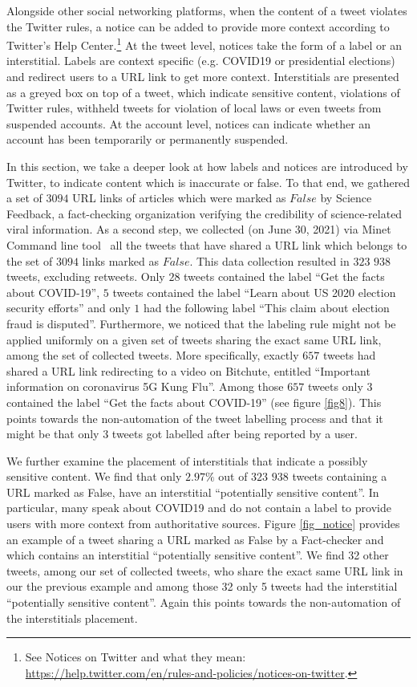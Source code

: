 \documentclass{article}
\begin{document}
Alongside other social networking platforms, when the content of a tweet violates the Twitter rules, a notice can be added to provide more context according to Twitter's Help Center.\footnote{See Notices on Twitter and what they mean: \href{https://help.twitter.com/en/rules-and-policies/notices-on-twitter}{https://help.twitter.com/en/rules-and-policies/notices-on-twitter}.} At the tweet level, notices take the form of a label or an interstitial. Labels are context specific (e.g. COVID19 or presidential elections) and  redirect users to a URL link to get more context. Interstitials are presented as a greyed box on top of a tweet, which indicate sensitive content, violations of Twitter rules, withheld tweets for violation of local laws or even tweets from suspended accounts. At the account level, notices can indicate whether an account has been temporarily or permanently suspended. 

\smallskip

In this section, we take a deeper look at how labels and notices are introduced by Twitter, to indicate content which is inaccurate or false. To that end, we gathered a set of $3094$ URL links of articles which were marked as $False$ by Science Feedback, a fact-checking organization verifying the credibility of science-related viral information. As a second step, we collected (on June 30, 2021) via Minet Command line tool~\cite{minet} all the tweets that have shared a URL link which belongs to the set of $3094$ links marked as $False$. This data collection resulted in $323$ $938$ tweets, excluding retweets. Only $28$ tweets contained the label { ``Get the facts about COVID-19''}, $5$ tweets contained the label { ``Learn about US 2020 election security efforts''} and only $1$ had the following label {``This claim about election fraud is disputed''}. Furthermore, we noticed that the labeling rule might not be applied uniformly on a given set of tweets sharing the exact same URL link, among the set of collected tweets. More specifically, exactly $657$ tweets had shared a URL link redirecting to a video on Bitchute, entitled ``Important information on coronavirus 5G Kung Flu''. Among those $657$ tweets only $3$ contained the label ``Get the facts about COVID-19'' (see figure \ref{fig8}). This points towards the non-automation of the tweet labelling process and that it might be that only $3$ tweets got labelled after being reported by a user. 

We further examine the placement of interstitials that indicate a possibly sensitive content. We find that only $2.97\%$ out of $323$ $938$ tweets containing a URL marked as False, have an interstitial ``potentially sensitive content''. In particular, many speak about COVID19 and do not contain a label to provide users with more context from authoritative sources. Figure \ref{fig_notice} provides an example of a tweet sharing a URL marked as False by a Fact-checker and which contains an interstitial ``potentially sensitive content''. We find 32 other tweets, among our set of collected tweets, who share the exact same URL link in our the previous example and among those 32 only 5 tweets had the interstitial ``potentially sensitive content''. Again this points towards the non-automation of the interstitials placement. 
\end{document}
